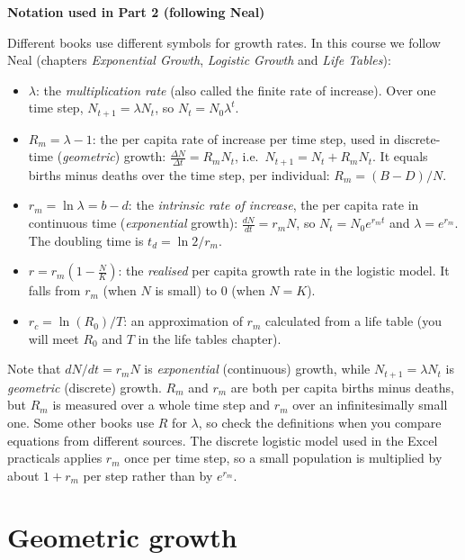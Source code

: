 \documentclass[
  a4paper]{book}
\providecommand{\tightlist}{%
  \setlength{\itemsep}{0pt}\setlength{\parskip}{0pt}}
\begin{document}
\textbf{Notation used in Part 2 (following Neal)}

Different books use different symbols for growth rates. In this course we follow Neal (chapters \emph{Exponential Growth}, \emph{Logistic Growth} and \emph{Life Tables}):

\begin{itemize}
\tightlist
\item
  \(\lambda\): the \emph{multiplication rate} (also called the finite rate of increase). Over one time step, \(N_{t+1} = \lambda N_t\), so \(N_t = N_0 \lambda^t\).
\item
  \(R_m = \lambda - 1\): the per capita rate of increase per time step, used in discrete-time (\emph{geometric}) growth: \(\frac{\Delta N}{\Delta t} = R_m N_t\), i.e.~\(N_{t+1} = N_t + R_m N_t\). It equals births minus deaths over the time step, per individual: \(R_m = (B - D)/N\).
\item
  \(r_m = \ln \lambda = b - d\): the \emph{intrinsic rate of increase}, the per capita rate in continuous time (\emph{exponential} growth): \(\frac{dN}{dt} = r_m N\), so \(N_t = N_0 e^{r_m t}\) and \(\lambda = e^{r_m}\). The doubling time is \(t_d = \ln 2 / r_m\).
\item
  \(r = r_m\left(1 - \frac{N}{K}\right)\): the \emph{realised} per capita growth rate in the logistic model. It falls from \(r_m\) (when \(N\) is small) to 0 (when \(N = K\)).
\item
  \(r_c = \ln(R_0)/T\): an approximation of \(r_m\) calculated from a life table (you will meet \(R_0\) and \(T\) in the life tables chapter).
\end{itemize}

Note that \(dN/dt = r_m N\) is \emph{exponential} (continuous) growth, while \(N_{t+1} = \lambda N_t\) is \emph{geometric} (discrete) growth. \(R_m\) and \(r_m\) are both per capita births minus deaths, but \(R_m\) is measured over a whole time step and \(r_m\) over an infinitesimally small one. Some other books use \(R\) for \(\lambda\), so check the definitions when you compare equations from different sources. The discrete logistic model used in the Excel practicals applies \(r_m\) once per time step, so a small population is multiplied by about \(1 + r_m\) per step rather than by \(e^{r_m}\).

\chapter{Geometric growth}\label{geometric-growth}
\end{document}
